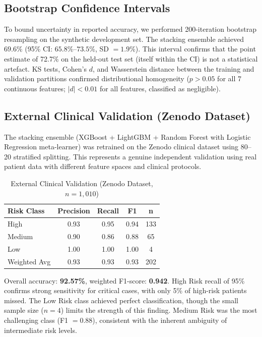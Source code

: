 \documentclass[11pt,a4paper]{article}
\begin{document}
\subsection{Bootstrap Confidence Intervals}

To bound uncertainty in reported accuracy, we performed 200-iteration bootstrap
resampling on the synthetic development set. The stacking ensemble achieved
$69.6\%$ (95\% CI: $65.8\%$--$73.5\%$, SD $= 1.9\%$). This interval confirms
that the point estimate of 72.7\% on the held-out test set (itself within the CI)
is not a statistical artefact. KS tests, Cohen's $d$, and Wasserstein distance
between the training and validation partitions confirmed distributional homogeneity
($p > 0.05$ for all 7 continuous features; $|d| < 0.01$ for all features,
classified as negligible).

\subsection{External Clinical Validation (Zenodo Dataset)}

The stacking ensemble (XGBoost + LightGBM + Random Forest with Logistic Regression
meta-learner) was retrained on the Zenodo clinical dataset using 80--20 stratified
splitting. This represents a genuine independent validation using real patient data
with different feature spaces and clinical protocols.

\begin{table}[H]
\centering
\caption{External Clinical Validation (Zenodo Dataset, $n = 1{,}010$)}
\label{tab:clinical}
\begin{tabular}{lcccc}
\toprule
\textbf{Risk Class} & \textbf{Precision} & \textbf{Recall} & \textbf{F1} & \textbf{n} \\
\midrule
High          & 0.93 & 0.95 & 0.94 & 133 \\
Medium        & 0.90 & 0.86 & 0.88 & 65  \\
Low           & 1.00 & 1.00 & 1.00 & 4   \\
\midrule
Weighted Avg  & 0.93 & 0.93 & 0.93 & 202 \\
\bottomrule
\end{tabular}
\end{table}

\noindent Overall accuracy: \textbf{92.57\%}, weighted F1-score: \textbf{0.942}.
High Risk recall of 95\% confirms strong sensitivity for critical cases, with only
5\% of high-risk patients missed. The Low Risk class achieved perfect classification,
though the small sample size ($n = 4$) limits the strength of this finding. Medium Risk
was the most challenging class (F1 $= 0.88$), consistent with the inherent ambiguity
of intermediate risk levels.
\end{document}
